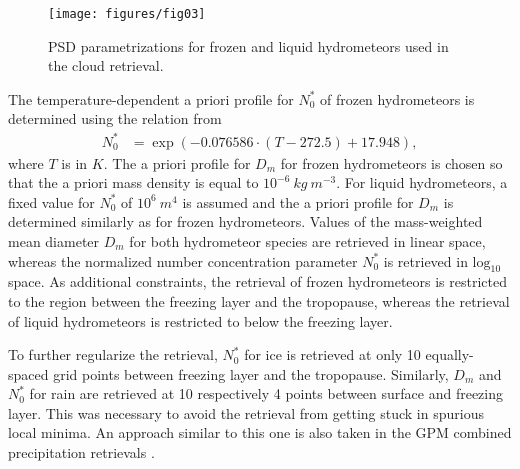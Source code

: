 \documentclass[journal abbreviation, manuscript]{copernicus}
\begin{document}
\begin{figure}
\centering
\texttt{[image: figures/fig03]}
\caption{PSD parametrizations for frozen and liquid hydrometeors
 used in the cloud retrieval.}
\label{fig:psds_retrieval}
\end{figure}

The temperature-dependent a priori profile for $N_0^*$ of frozen
hydrometeors is determined using the relation from \cite{delanoe14}
%
\begin{align}
N_0^* &= \exp \left ( -0.076586 \cdot (T - 272.5) + 17.948 \right ),
\end{align}
%
where $T$ is in $\unit{K}$. The a priori profile for $D_m$ for frozen
hydrometeors is chosen so that the a priori mass density is equal to
$10^{-6}\ \unit{kg\ m^{-3}}$. For liquid hydrometeors, a fixed value for $N_0^*$ of
$10^6\ \unit{m^4}$ is assumed and the a priori profile for $D_m$ is determined
similarly as for frozen hydrometeors. Values of the mass-weighted mean diameter
$D_m$ for both hydrometeor species are retrieved in linear space, whereas the
normalized number concentration parameter $N_0^*$ is retrieved in
$\text{log}_{10}$ space. As additional constraints, the retrieval of frozen
hydrometeors is restricted to the region between the freezing layer and the
tropopause, whereas the retrieval of liquid hydrometeors is restricted to below
the freezing layer.

To further regularize the retrieval, $N_0^*$ for ice is retrieved at only 10
equally-spaced grid points between freezing layer and the tropopause. Similarly,
$D_m$ and $N_0^*$ for rain are retrieved at 10 respectively 4 points between surface and
freezing layer. This was necessary to avoid the retrieval from getting stuck in
spurious local minima. An approach similar to this one is also taken in the GPM
combined precipitation retrievals \citep{grecu16}.
\end{document}
